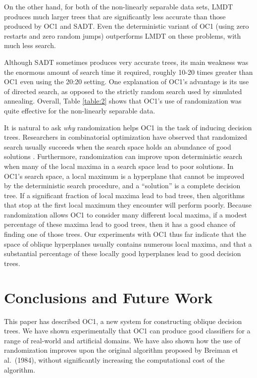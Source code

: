 On the other hand, for both of the non-linearly separable data sets,
LMDT produces much larger trees that are significantly less accurate
than those produced by OC1 and SADT.  Even the deterministic variant
of OC1 (using zero restarts and zero random jumps) outperforms LMDT on
these problems, with much less search.  

Although SADT sometimes produces very accurate trees, its main
weakness was the enormous amount of search time it required, roughly
10-20 times greater than OC1 even using the 20:20 setting.  One
explanation of OC1's advantage is its use of directed search, as
opposed to the strictly random search used by simulated annealing.
Overall, Table \ref{table:2} shows that OC1's use of randomization was
quite effective for the non-linearly separable data.

It is natural to ask {\it why} randomization helps OC1 in the task of
inducing decision trees.  Researchers in combinatorial optimization
have observed that randomized search usually succeeds when the search
space holds an abundance of good solutions \cite{gupta/etal/94}.
Furthermore, randomization can improve upon deterministic search when
many of the local maxima in a search space lead to poor solutions.  In
OC1's search space, a local maximum is a hyperplane that cannot be
improved by the deterministic search procedure, and a ``solution'' is
a complete decision tree.  If a significant fraction of local maxima
lead to bad trees, then algorithms that stop at the first local
maximum they encounter will perform poorly.  Because randomization
allows OC1 to consider many different local maxima, if a modest
percentage of these maxima lead to good trees, then it has a good
chance of finding one of those trees.  Our experiments with OC1 thus
far indicate that the space of oblique hyperplanes usually contains
numerous local maxima, and that a substantial percentage of these
locally good hyperplanes lead to good decision trees.

\section{Conclusions and Future Work}
\label{section:conclude}

This paper has described OC1, a new system for constructing oblique
decision trees.  We have shown experimentally that OC1 can produce
good classifiers for a range of real-world and artificial domains.  We
have also shown how the use of randomization improves upon the
original algorithm proposed by Breiman et al.~(1984), without
significantly increasing the computational cost of the algorithm.

